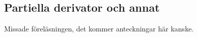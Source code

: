 \documentclass[a4paper]{article}
\begin{document}
\providecommand\fname{}
\renewcommand\fname{19-09-10}

\subsection{Partiella derivator och annat}
Missade föreläsningen, det kommer anteckningar här kanske.
\end{document}
